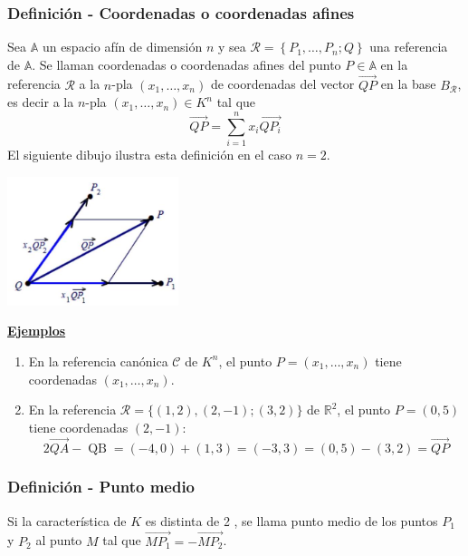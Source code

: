 \documentclass[12pt, a4paper, ones, notitlepage, openany,titlepage]{article}
\newcommand{\ejemplos}{\noindent\underline{\textbf{Ejemplos}}}
\begin{document}
\subsubsection{Definición - Coordenadas o coordenadas afines}
Sea $\mathbb{A}$ un espacio afín de dimensión $n$ y sea $\mathcal{R}=\left\{P_{1}, \ldots, P_{n} ; Q\right\}$ una referencia de $\mathbb{A}$. Se llaman coordenadas o coordenadas afines del punto $P \in \mathbb{A}$ en la referencia $\mathcal{R}$ a la $n$-pla $\left(x_{1}, \ldots, x_{n}\right)$ de coordenadas del vector $\overrightarrow{Q P}$ en la base $B_{\mathcal{R}}$, es decir a la $n$-pla $\left(x_{1}, \ldots, x_{n}\right) \in K^{n}$ tal que
$$
\overrightarrow{Q P}=\sum_{i=1}^{n} x_{i} \overrightarrow{Q P_{i}}
$$
\noindent El siguiente dibujo ilustra esta definición en el caso $n=2$.

\begin{center}
\includegraphics[max width=5cm]{2023_03_01_7659aec5e35f9a9b2d3cg-12(2)}
\end{center}

\ejemplos
\begin{enumerate}[label=(\arabic*)]
\item En la referencia canónica $\mathcal{C}$ de $K^{n}$, el punto $P=\left(x_{1}, \ldots, x_{n}\right)$ tiene coordenadas $\left(x_{1}, \ldots, x_{n}\right)$.

\item En la referencia $\mathcal{R}=\{(1,2),(2,-1) ;(3,2)\}$ de $\mathbb{R}^{2}$, el punto $P=(0,5)$ tiene coordenadas $(2,-1)$:
$$
2 \overrightarrow{QA} - \operatorname{QB} = (-4,0) + (1,3) = (-3,3) = (0,5) - (3,2) = \overrightarrow{QP}
$$
\end{enumerate}

\subsubsection{Definición - Punto medio}
Si la característica de $K$ es distinta de 2 , se llama punto medio de los puntos $P_{1}$ y $P_{2}$ al punto $M$ tal que $\overrightarrow{M P_{1}}=-\overrightarrow{M P_{2}}$.
\end{document}
